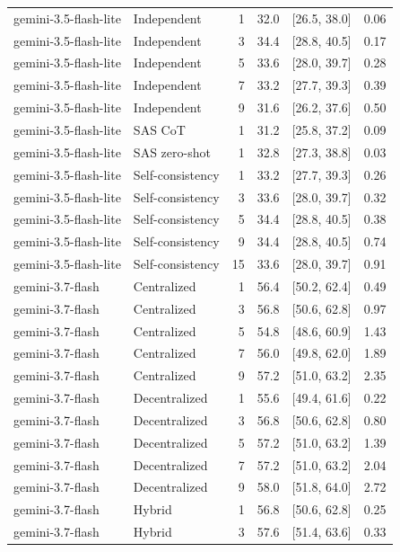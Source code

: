 \begin{tabular}{@{}llrrrr@{}}
gemini-3.5-flash-lite & Independent & 1 & 32.0 & [26.5, 38.0] & 0.06 \\
gemini-3.5-flash-lite & Independent & 3 & 34.4 & [28.8, 40.5] & 0.17 \\
gemini-3.5-flash-lite & Independent & 5 & 33.6 & [28.0, 39.7] & 0.28 \\
gemini-3.5-flash-lite & Independent & 7 & 33.2 & [27.7, 39.3] & 0.39 \\
gemini-3.5-flash-lite & Independent & 9 & 31.6 & [26.2, 37.6] & 0.50 \\
gemini-3.5-flash-lite & SAS CoT & 1 & 31.2 & [25.8, 37.2] & 0.09 \\
gemini-3.5-flash-lite & SAS zero-shot & 1 & 32.8 & [27.3, 38.8] & 0.03 \\
gemini-3.5-flash-lite & Self-consistency & 1 & 33.2 & [27.7, 39.3] & 0.26 \\
gemini-3.5-flash-lite & Self-consistency & 3 & 33.6 & [28.0, 39.7] & 0.32 \\
gemini-3.5-flash-lite & Self-consistency & 5 & 34.4 & [28.8, 40.5] & 0.38 \\
gemini-3.5-flash-lite & Self-consistency & 9 & 34.4 & [28.8, 40.5] & 0.74 \\
gemini-3.5-flash-lite & Self-consistency & 15 & 33.6 & [28.0, 39.7] & 0.91 \\
gemini-3.7-flash & Centralized & 1 & 56.4 & [50.2, 62.4] & 0.49 \\
gemini-3.7-flash & Centralized & 3 & 56.8 & [50.6, 62.8] & 0.97 \\
gemini-3.7-flash & Centralized & 5 & 54.8 & [48.6, 60.9] & 1.43 \\
gemini-3.7-flash & Centralized & 7 & 56.0 & [49.8, 62.0] & 1.89 \\
gemini-3.7-flash & Centralized & 9 & 57.2 & [51.0, 63.2] & 2.35 \\
gemini-3.7-flash & Decentralized & 1 & 55.6 & [49.4, 61.6] & 0.22 \\
gemini-3.7-flash & Decentralized & 3 & 56.8 & [50.6, 62.8] & 0.80 \\
gemini-3.7-flash & Decentralized & 5 & 57.2 & [51.0, 63.2] & 1.39 \\
gemini-3.7-flash & Decentralized & 7 & 57.2 & [51.0, 63.2] & 2.04 \\
gemini-3.7-flash & Decentralized & 9 & 58.0 & [51.8, 64.0] & 2.72 \\
gemini-3.7-flash & Hybrid & 1 & 56.8 & [50.6, 62.8] & 0.25 \\
gemini-3.7-flash & Hybrid & 3 & 57.6 & [51.4, 63.6] & 0.33 \\

\end{tabular}
